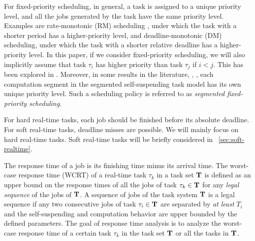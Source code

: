 For fixed-priority scheduling, in general, a task is assigned to a
unique priority level, and all the jobs generated by the task have the
same priority level. Examples are rate-monotonic (RM) scheduling
\cite{Liu_1973}, under which the task with a shorter period has a
higher-priority level, and deadline-monotonic (DM) scheduling, under which
the task with a shorter relative deadline has a higher-priority level.
In this paper, if we consider fixed-priority scheduling, we will also implicitly assume that task $\tau_i$ has higher priority than task $\tau_j$ if $i < j$.
This has been explored in
\cite{Raj:suspension1991,RTCSA-KimCPKH95,MingLiRTCSA1994,PH:rtss98,ECRTS-AudsleyB04,RTAS-AudsleyB04,RTCSA-BletsasA05,LR:rtas10,RTSS-KimANR13,LiuChen:rtss2014,huangpass:dac2015,Huang:multiseg,WC16-suspend-DATE,ChenECRTS2016-suspension}.
Moreover, in some results in the literature, \eg,
\cite{RTSS-KimANR13,DBLP:journals/ieicet/DingTT09}, each computation
segment in the segmented self-suspending task model has its own unique
priority level. Such a scheduling
policy is referred to as \emph{segmented fixed-priority scheduling}.

For hard real-time tasks, each job should be finished before its
absolute deadline. For soft real-time tasks, deadline misses are
possible. We will mainly focus on hard real-time tasks. 
Soft real-time tasks will be briefly considered in
\mysectionref{}~\ref{sec:soft-realtime}.

The response time of a job is its finishing time minus its arrival
time.  The worst-case response time (WCRT) of a real-time task
$\tau_k$ in a task set ${\bf T}$ is defined as an upper bound on the
response times of all the jobs of task $\tau_k \in {\bf T}$ for any
\emph{legal sequence} of the jobs of ${\bf T}$. A sequence of jobs of
the task system ${\bf T}$ is a legal sequence if any two consecutive
jobs of task $\tau_i \in {\bf T}$ are separated by \emph{at least}
$T_i$ and the self-suspending and computation behavior are upper
bounded by the defined parameters. The goal of response time analysis is to
analyze the worst-case response time of a certain task $\tau_k$ in the
task set ${\bf T}$ or all the tasks in ${\bf T}$.

